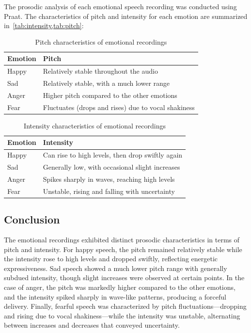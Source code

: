 \documentclass{article}
\begin{document}
The prosodic analysis of each emotional speech recording was conducted using
Praat. The characteristics of pitch and intensity for each emotion are
summarized in~\cref{tab:intensity,tab:pitch}:

\begin{table}[h]
	\centering
	\caption{Pitch characteristics of emotional recordings}
	\begin{tabular}{ll}
		\hline
		\textbf{Emotion} & \textbf{Pitch}                                      \\
		\hline
		Happy            & Relatively stable throughout the audio              \\
		Sad              & Relatively stable, with a much lower range          \\
		Anger            & Higher pitch compared to the other emotions         \\
		Fear             & Fluctuates (drops and rises) due to vocal shakiness \\
		\hline
	\end{tabular}\label{tab:pitch}
\end{table}

\begin{table}[h]
	\centering
	\caption{Intensity characteristics of emotional recordings}
	\begin{tabular}{ll}
		\hline
		\textbf{Emotion} & \textbf{Intensity}                               \\
		\hline
		Happy            & Can rise to high levels, then drop swiftly again \\
		Sad              & Generally low, with occasional slight increases  \\
		Anger            & Spikes sharply in waves, reaching high levels    \\
		Fear             & Unstable, rising and falling with uncertainty    \\
		\hline
	\end{tabular}\label{tab:intensity}
\end{table}

\subsection{Conclusion}
The emotional recordings exhibited distinct prosodic characteristics in terms
of pitch and intensity. For happy speech, the pitch remained relatively stable
while the intensity rose to high levels and dropped swiftly, reflecting
energetic expressiveness. Sad speech showed a much lower pitch range with
generally subdued intensity, though slight increases were observed at certain
points. In the case of anger, the pitch was markedly higher compared to the
other emotions, and the intensity spiked sharply in wave-like patterns,
producing a forceful delivery. Finally, fearful speech was characterized by
pitch fluctuations—dropping and rising due to vocal shakiness—while the
intensity was unstable, alternating between increases and decreases that
conveyed uncertainty.
\end{document}
